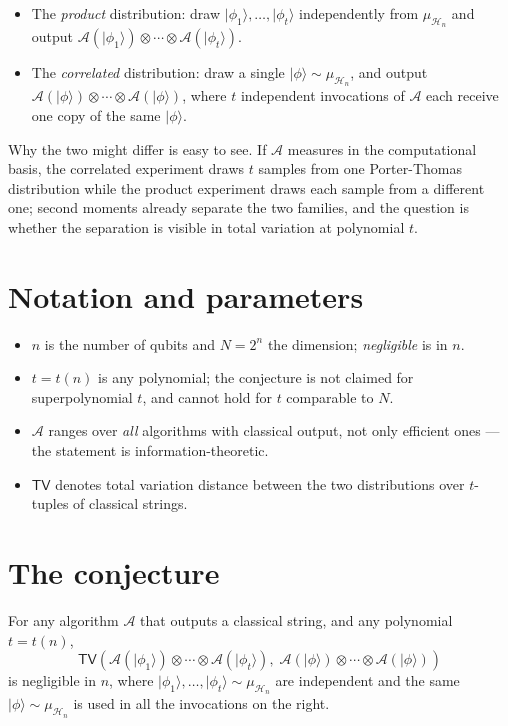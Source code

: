 \documentclass{conjura-conjecture}
\newcommand{\muH}{\mu_{\mathcal{H}_{n}}}
\newcommand{\A}{\mathcal{A}}
\newcommand{\TV}{\mathsf{TV}}
\newcommand{\ket}[1]{\lvert#1\rangle}
\begin{document}
\begin{itemize}[nosep]
  \item The \emph{product} distribution: draw
    $\ket{\phi_1}, \dots, \ket{\phi_t}$ independently from $\muH$ and
    output $\A(\ket{\phi_1}) \otimes \cdots \otimes \A(\ket{\phi_t})$.
  \item The \emph{correlated} distribution: draw a single
    $\ket{\phi} \sim \muH$, and output
    $\A(\ket{\phi}) \otimes \cdots \otimes \A(\ket{\phi})$, where $t$
    independent invocations of $\A$ each receive one copy of the same
    $\ket{\phi}$.
\end{itemize}

Why the two might differ is easy to see. If $\A$ measures in the
computational basis, the correlated experiment draws $t$ samples from one
Porter-Thomas distribution while the product experiment draws each sample
from a different one; second moments already separate the two families,
and the question is whether the separation is visible in total variation
at polynomial $t$.

\section{Notation and parameters}\label{sec:notation}

\begin{itemize}[nosep]
  \item $n$ is the number of qubits and $N = 2^{n}$ the dimension;
    \emph{negligible} is in $n$.
  \item $t = t(n)$ is any polynomial; the conjecture is not claimed for
    superpolynomial $t$, and cannot hold for $t$ comparable to $N$.
  \item $\A$ ranges over \emph{all} algorithms with classical output, not
    only efficient ones --- the statement is information-theoretic.
  \item $\TV$ denotes total variation distance between the two
    distributions over $t$-tuples of classical strings.
\end{itemize}

\section{The conjecture}\label{sec:conjectures}

\begin{conjecture}\label{conj:main}
For any algorithm $\A$ that outputs a classical string, and any
polynomial $t = t(n)$,
\[
  \TV\!\left(
    \A(\ket{\phi_1}) \otimes \cdots \otimes \A(\ket{\phi_t}),\;
    \A(\ket{\phi}) \otimes \cdots \otimes \A(\ket{\phi})
  \right)
\]
is negligible in $n$, where $\ket{\phi_1}, \dots, \ket{\phi_t} \sim \muH$
are independent and the same $\ket{\phi} \sim \muH$ is used in all the
invocations on the right.
\end{conjecture}
\end{document}
